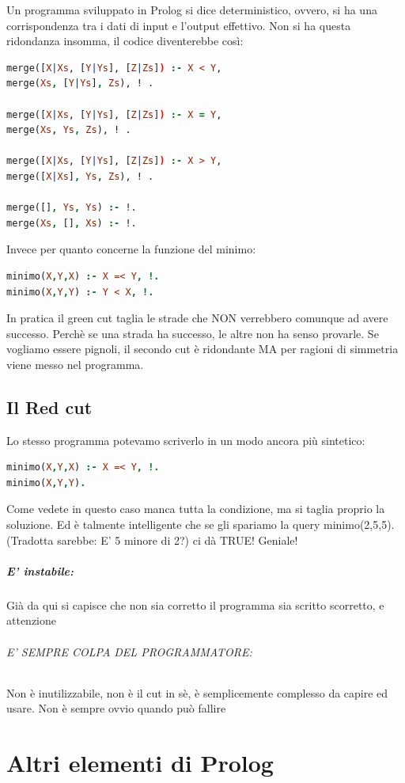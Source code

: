 \documentclass[12pt, a4paper, openany, oneside]{book}
\begin{document}
Un programma sviluppato in Prolog si dice deterministico, ovvero, si ha una 
corrispondenza tra i dati di input e l'output effettivo. Non si ha questa 
ridondanza insomma, il codice diventerebbe così:
\begin{lstlisting}[language=Prolog] 
merge([X|Xs, [Y|Ys], [Z|Zs]) :- X < Y,
merge(Xs, [Y|Ys], Zs), ! .

merge([X|Xs, [Y|Ys], [Z|Zs]) :- X = Y,
merge(Xs, Ys, Zs), ! .

merge([X|Xs, [Y|Ys], [Z|Zs]) :- X > Y,
merge([X|Xs], Ys, Zs), ! .

merge([], Ys, Ys) :- !.
merge(Xs, [], Xs) :- !.
\end{lstlisting} 
Invece per quanto concerne la funzione del minimo:
\begin{lstlisting}[language=Prolog] 
minimo(X,Y,X) :- X =< Y, !.
minimo(X,Y,Y) :- Y < X, !.
\end{lstlisting} 
In pratica il green cut taglia le strade che NON verrebbero comunque ad avere
successo. Perchè se una strada ha successo, le altre non ha senso provarle. 
Se vogliamo essere pignoli, il secondo cut è ridondante MA per ragioni di 
simmetria viene messo nel programma. 
\section{Il \color{red}Red cut\color{black}}
Lo stesso programma potevamo scriverlo in un modo ancora più sintetico:
\begin{lstlisting}[language=Prolog] 
minimo(X,Y,X) :- X =< Y, !. 
minimo(X,Y,Y).
\end{lstlisting} 
Come vedete in questo caso manca tutta la condizione, ma si taglia proprio
la soluzione. Ed è talmente intelligente che se gli spariamo la query
minimo(2,5,5). (Tradotta sarebbe: E' 5 minore di 2?) ci dà TRUE! Geniale!
\paragraph{E' instabile: }Già da qui si capisce che non sia corretto il programma
sia scritto scorretto, e attenzione 
\subparagraph{E' SEMPRE COLPA DEL PROGRAMMATORE: }Non è inutilizzabile, 
non è il cut in sè, è semplicemente complesso da capire ed usare. Non è sempre
ovvio quando può fallire
\chapter{Altri elementi di Prolog}
\end{document}
